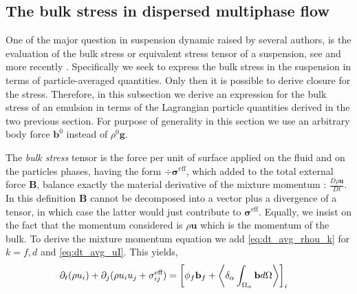 

\subsection{The bulk stress in dispersed multiphase flow}



One of the major question in suspension dynamic raised by several authors, is the evaluation of the bulk stress or equivalent stress tensor of a suspension, see \citep{prosperetti2006stress, batchelor1970stress,zhang1997momentum,nadim1996concise} and more recently \citet{dolata2020heterogeneous}. 
Specifically we seek to express the bulk stress in the suspension in terms of particle-averaged quantities. 
Only then it is possible to derive closure for the stress. 
Therefore, in this subsection we derive an expression for the bulk stress of an emulsion in terms of the Lagrangian particle quantities derived in the two previous section. 
For purpose of generality in this section we use an arbitrary body force $\textbf{b}^0$ instead of $\rho^0 \textbf{g}$. 

The \textit{bulk stress} tensor is the force per unit of surface applied on the fluid and on the particles phases, having the form $\div \bm{\sigma}^\text{eff}$, which added to the total external force $\textbf{B}$, balance exactly the material derivative of the mixture momentum : $\frac{D \rho \textbf{u}}{Dt}$. 
In this definition $\textbf{B}$ cannot be decomposed into a vector plus a divergence of a tensor, in which case the latter would just contribute to $\bm{\sigma}^\text{eff}$.
Equally, we insist on the fact that the momentum considered is $\rho\textbf{u}$ which is the momentum of the bulk. 
To derive the mixture momentum equation we add \ref{eq:dt_avg_rhou_k} for $k = f,d$ and \ref{eq:dt_avg_uI}. 
This yields, 
\begin{align}
    \label{eq:momentum_bulk}
    \partial_t (\rho u_i)
    + \partial_j  (\rho u_iu_j
    + \sigma_{ij}^\text{eff})
    &= \left[\phi_f \textbf{b}_f + \left<\delta_\alpha \int_{\Omega_\alpha} \textbf{b} d\Omega\right>\right]_i
\end{align}

